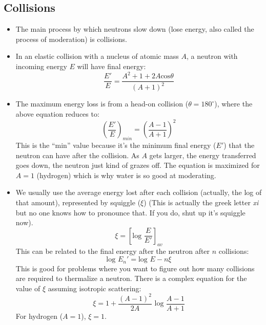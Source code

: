 \documentclass[letter]{article}
\begin{document}
\subsection{Collisions}
\begin{itemize}
\item The main process by which neutrons slow down (lose energy, also
  called the process of moderation) is collisions.
\item In an elastic collision with a nucleus of atomic mass $A$, a
  neutron with incoming energy $E$ will have final energy:
  \begin{equation*}
    \frac{E'}{E} = \frac{A^2 + 1 + 2A\text{cos}\theta}{{(A+1)}^2}
  \end{equation*}
\cite[pp.448]{krane}
\item The maximum energy loss is from a head-on collision ($\theta =
  180^\circ$), where the above equation reduces to:
  \begin{equation*}
    \left(\frac{E'}{E}\right)_{min} = {\left(\frac{A-1}{A+1}\right)}^2
  \end{equation*}
This is the ``min'' value because it's the minimum final energy ($E'$)
that the neutron can have after the collision. As $A$ gets larger, the
energy transferred goes down, the neutron just kind of grazes off. The
equation is maximized for $A=1$ (hydrogen) which is why water is so
good at moderating.~\cite[pp. 448]{krane}
\item We usually use the average energy lost after each collision
  (actually, the log of that amount), represented by squiggle
  ($\xi$) (This is actually the greek letter \textit{xi} but no one
  knows how to pronounce that. If you do, shut up it's squiggle now).
  \begin{equation*}
    \xi = {\left[\text{log }\frac{E}{E'}\right]}_{av}
  \end{equation*}
This can be related to the final energy after the neutron after $n$
collisions:
\begin{equation*}
  \text{log }E_n' = \text{log }E - n\xi
\end{equation*}
This is good for problems where you want to figure out how many
collisions are required to thermalize a neutron. There is a complex
equation for the value of $\xi$ assuming isotropic scattering:
\begin{equation*}
  \xi = 1 + \frac{{(A-1)}^2}{2A}\text{ log }\frac{A-1}{A+1}
\end{equation*}
For hydrogen ($A=1$), $\xi = 1$.~\cite[pp.449-450]{krane}
\end{itemize}
\end{document}
